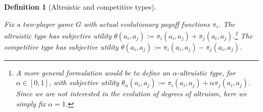 \documentclass[fleqn,reqno,12pt]{article}
\theoremstyle{Satz}
\newtheorem{definition}[theorem]{Definition}
\theoremstyle{Bsp}
\renewcommand{\footnotesize}{\normalsize}
\begin{document}
\begin{definition}[Altruistic and competitive types] \label{defn:alttype}

  Fix a two-player game $G$ with actual evolutionary payoff functions $\pi_i$. The \textit{altruistic type}
  has subjective utility $\theta(a_i, a_j):=\pi_i(a_i,a_j) + \pi_j(a_i,a_j)$.\footnote{A
    more general formulation would be to define an $ \alpha$-altruistic type, for
    $\alpha \in [0,1]$, with subjective utility
    $ \theta_\alpha(a_i, a_j):=\pi_i(a_i,a_j) + \alpha \pi_j(a_i,a_j)$. Since we are not
    interested in the evolution of degrees of altruism, here we simply fix $ \alpha = 1 $.} The
  \emph{competitive type} has subjective utility
  $\theta(a_i, a_j):=\pi_i(a_i,a_j) - \pi_j(a_i,a_j)$.

\end{definition}



\begin{table}[]
\centering
\footnotesize
{}                  
\caption{Average evolutionary fitness from Monte Carlo simulations of 100,000 symmetric $2 \times 2$ games}
\label{tab:ExpectedFitness_2x2_Full}        
\end{table}   
 
\end{document}
